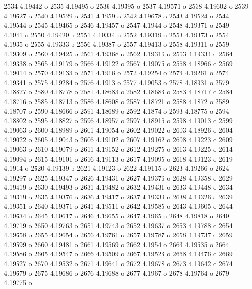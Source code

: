 2534  4.19442  o
 2535  4.19495  o
 2536  4.19395  o
 2537  4.19571  o
 2538  4.19602  o
 2539  4.19627  o
 2540  4.19529  o
 2541  4.1959  o
 2542  4.19678  o
 2543  4.19524  o
 2544  4.19544  o
 2545  4.19465  o
 2546  4.19457  o
 2547  4.1944  o
 2548  4.19371  o
 2549  4.1941  o
 2550  4.19429  o
 2551  4.19334  o
 2552  4.19319  o
 2553  4.19373  o
 2554  4.1935  o
 2555  4.19333  o
 2556  4.19387  o
 2557  4.19413  o
 2558  4.19311  o
 2559  4.19309  o
 2560  4.19425  o
 2561  4.19368  o
 2562  4.19316  o
 2563  4.19334  o
 2564  4.19338  o
 2565  4.19179  o
 2566  4.19122  o
 2567  4.19075  o
 2568  4.18966  o
 2569  4.19014  o
 2570  4.19133  o
 2571  4.1916  o
 2572  4.19254  o
 2573  4.19261  o
 2574  4.19341  o
 2575  4.19284  o
 2576  4.1913  o
 2577  4.19053  o
 2578  4.18931  o
 2579  4.18827  o
 2580  4.18778  o
 2581  4.18683  o
 2582  4.18683  o
 2583  4.18717  o
 2584  4.18716  o
 2585  4.18713  o
 2586  4.18608  o
 2587  4.18721  o
 2588  4.1872  o
 2589  4.18707  o
 2590  4.18666  o
 2591  4.18689  o
 2592  4.1874  o
 2593  4.18775  o
 2594  4.18802  o
 2595  4.18827  o
 2596  4.18957  o
 2597  4.18916  o
 2598  4.19013  o
 2599  4.19063  o
 2600  4.18989  o
 2601  4.19054  o
 2602  4.19022  o
 2603  4.18926  o
 2604  4.19022  o
 2605  4.19043  o
 2606  4.19102  o
 2607  4.19162  o
 2608  4.19223  o
 2609  4.19063  o
 2610  4.19079  o
 2611  4.19152  o
 2612  4.19275  o
 2613  4.19225  o
 2614  4.19094  o
 2615  4.19101  o
 2616  4.19113  o
 2617  4.19095  o
 2618  4.19123  o
 2619  4.1914  o
 2620  4.19139  o
 2621  4.19123  o
 2622  4.19115  o
 2623  4.19266  o
 2624  4.19297  o
 2625  4.19347  o
 2626  4.19431  o
 2627  4.19376  o
 2628  4.19358  o
 2629  4.19419  o
 2630  4.19493  o
 2631  4.19482  o
 2632  4.19431  o
 2633  4.19448  o
 2634  4.19319  o
 2635  4.19376  o
 2636  4.19417  o
 2637  4.19339  o
 2638  4.19326  o
 2639  4.19351  o
 2640  4.19371  o
 2641  4.19511  o
 2642  4.19585  o
 2643  4.19605  o
 2644  4.19634  o
 2645  4.19617  o
 2646  4.19655  o
 2647  4.1965  o
 2648  4.19818  o
 2649  4.19719  o
 2650  4.19763  o
 2651  4.19743  o
 2652  4.19637  o
 2653  4.19788  o
 2654  4.19658  o
 2655  4.19654  o
 2656  4.19761  o
 2657  4.19787  o
 2658  4.19737  o
 2659  4.19599  o
 2660  4.19481  o
 2661  4.19569  o
 2662  4.1954  o
 2663  4.19535  o
 2664  4.19586  o
 2665  4.19547  o
 2666  4.19509  o
 2667  4.19523  o
 2668  4.19476  o
 2669  4.19527  o
 2670  4.19532  o
 2671  4.19641  o
 2672  4.19678  o
 2673  4.19642  o
 2674  4.19679  o
 2675  4.19686  o
 2676  4.19688  o
 2677  4.1967  o
 2678  4.19764  o
 2679  4.19775  o
